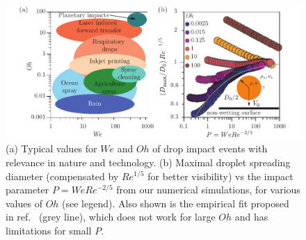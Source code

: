 \documentclass[preprint,amssymb,superscriptaddress,aps,prl,floatfix]{revtex4-1}
\begin{document}
\begin{figure}
	\centering
	\includegraphics[width=\linewidth]{Figure0_v1-eps-converted-to.pdf}
	\caption{(a) Typical values for $We$ and $Oh$ of drop impact events with relevance in nature and technology.
 (b) Maximal droplet spreading diameter (compensated by  $Re^{1/5} $ for better visibility) vs the impact parameter $P = We Re^{-2/5}$ from our numerical simulations, for various
 values of $Oh$ (see legend). Also shown is the empirical fit proposed in
 ref.\ 
  \cite{laan2014maximum} (grey line), which  does not work for large 
 $Oh$ and has limitations for small $P$. 
 }
	\label{fig:intro}
\end{figure}
\end{document}
